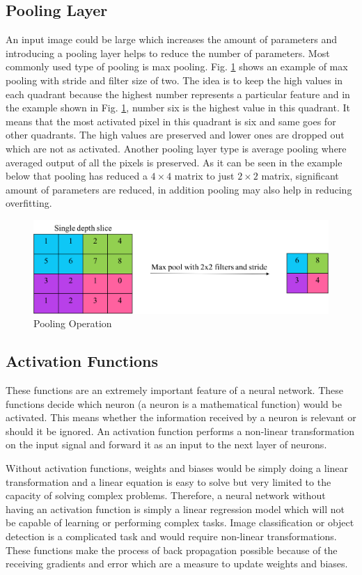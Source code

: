 \documentclass[11pt]{article}
\begin{document}
\subsection{Pooling Layer}
An input image could be large which increases the amount of parameters and introducing a pooling layer helps to reduce the number of parameters. Most commonly used type of pooling is max pooling. Fig. \ref{fig:Pooling Operation} shows an example of max pooling with stride and filter size of two. The idea is to keep the high values in each quadrant because the highest number represents a particular feature and in the example shown in Fig. \ref{fig:Pooling Operation}, number six is the highest value in this quadrant. It means that the most activated pixel in this quadrant is six and same goes for other quadrants. The high values are preserved and lower ones are dropped out which are not as activated. Another pooling layer type is average pooling where averaged output of all the pixels is preserved. As it can be seen in the example below that pooling has reduced a $4 \times 4$ matrix to just $2 \times 2$ matrix, significant amount of parameters are reduced, in addition pooling may also help in reducing overfitting.

\begin{figure}[H]
	\centering
	\includegraphics[width=.6\linewidth]{files/cnn_architecture/pooling.png}
	\caption{Pooling Operation}
	\label{fig:Pooling Operation}
\end{figure}

\subsection{Activation Functions}
These functions are an extremely important feature of a neural network. These functions decide which neuron (a neuron is a mathematical function) would be activated. This means whether the information received by a neuron is relevant or should it be ignored. An activation function performs a non-linear transformation on the input signal and forward it as an input to the next layer of neurons.

Without activation functions, weights and biases would be simply doing a linear transformation and a linear equation is easy to solve but very limited to the capacity of solving complex problems. Therefore, a neural network without having an activation function is simply a linear regression model which will not be capable of learning or performing complex tasks. Image classification or object detection is a complicated task and would require non-linear transformations. These functions make the process of back propagation possible because of the receiving gradients and error which are a measure to update weights and biases.
\end{document}

